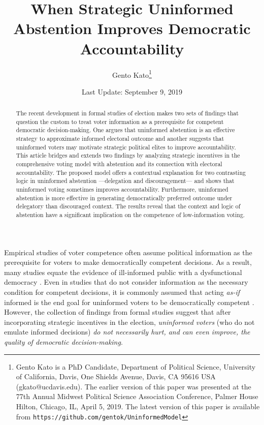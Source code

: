 \documentclass[letterpaper, 12pt]{article}
\title{When Strategic Uninformed Abstention Improves Democratic Accountability}
\author{Gento Kato\thanks{Gento Kato is a PhD Candidate, Department of Political Science, University of California, Davis, One Shields Avenue, Davis, CA 95616 USA (gkato@ucdavis.edu). The earlier version of this paper was presented at the 77th Annual Midwest Political Science Association Conference, Palmer House Hilton, Chicago, IL, April 5, 2019. The latest version of this paper is available from \texttt{https://github.com/gentok/UninformedModel}}}
\affil{University of California, Davis}
\date{Last Update: September 9, 2019}
\begin{document}
    
    \begin{titlepage}
    
    
    \maketitle
    \thispagestyle{empty}
    
    \clearpage
    \thispagestyle{empty}
    
    \begin{abstract}
        The recent development in formal studies of election makes two sets of findings that question the custom to treat voter information as a prerequisite for competent democratic decision-making. One argues that uninformed abstention is an effective strategy to approximate informed electoral outcome and another suggests that uninformed voters may motivate strategic political elites to improve accountability. This article bridges and extends two findings by analyzing strategic incentives in the comprehensive voting model with abstention and its connection with electoral accountability. The proposed model offers a contextual explanation for two contrasting logic in uninformed abstention ---delegation and discouragement--- and shows that uninformed voting sometimes improves accountability. Furthermore, uninformed abstention is more effective in generating democratically preferred outcome under delegatory than discouraged context. The results reveal that the context and logic of abstention have a significant implication on the competence of low-information voting.
    \end{abstract}
    \end{titlepage}
    
    \clearpage
    
    \par Empirical studies of voter competence often assume political information as the prerequisite for voters to make democratically competent decisions. As a result, many studies equate the evidence of ill-informed public with a dysfunctional democracy \citep{Converse1964thna, Dellicarpini1996wham, Bartels1996unvo, Somin1998voig, Achen2016defo}. Even in studies that do not consider information as the necessary condition for competent decisions, it is commonly assumed that acting \textit{as-if} informed is the end goal for uninformed voters to be democratically competent \citep{Lupia1994shve, Lupia2016unwh, Popkin1994thre, Boudreau2009clth}. However, the collection of findings from formal studies suggest that after incorporating strategic incentives in the election, \textit{uninformed voters} (who do not emulate informed decisions) \textit{do not necessarily hurt, and can even improve, the quality of democratic decision-making}. 
\end{document}
